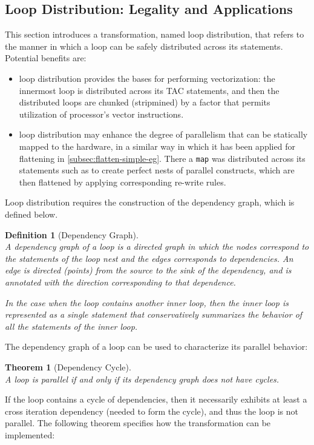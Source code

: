 \documentclass[acmsmall,review]{acmart}\settopmatter{printfolios=true,printccs=false,printacmref=false}
\newtheorem{mydef}{Definition}
\newtheorem{mytheo}{Theorem}
\begin{document}
\subsection{Loop Distribution: Legality and Applications}
\label{subsec:loop-distrib}

This section introduces a transformation, named loop 
distribution, that refers to the manner in which a loop can 
be safely distributed across its statements. 
Potential benefits are:
\begin{itemize}
    \item loop distribution provides the bases for performing 
        vectorization:
        the innermost loop is distributed across its TAC statements,
        and then the distributed loops are chunked (stripmined) 
        by a factor that permits utilization of processor's vector 
        instructions.
    \item loop distribution may enhance the degree of
        parallelism that can be statically mapped to the 
        hardware, in a similar way in which it has been 
        applied for flattening in \cref{subsec:flatten-simple-eg}.
        There a \lstinline{map} was distributed across its
        statements such as to create perfect nests of parallel
        constructs, which are then flattened by applying
        corresponding re-write rules. 
\end{itemize}

Loop distribution requires the construction of the dependency
graph, which is defined below.

\begin{mydef}[Dependency Graph]\label{Dep-Graph}
$\mbox{ }$\\
A dependency graph of a loop is a directed graph in which 
the nodes correspond to the statements of the loop nest and the
edges corresponds to dependencies. An edge is directed (points) 
from the source to the sink of the dependency, and is annotated
with the direction corresponding to that dependence. 

In the case when the loop contains another inner loop, then 
the inner loop is represented as a single statement that conservatively 
summarizes the behavior of all the statements of the inner loop.
\end{mydef}

The dependency graph of a loop can be used to characterize its
parallel behavior:
\begin{mytheo}[Dependency Cycle]\label{Dep-Cycle}
$\mbox{ }$\\
A loop is parallel {\em if and only if} its dependency graph
does not have cycles.
\end{mytheo}
If the loop contains a cycle of dependencies, then it necessarily
exhibits at least a cross iteration dependency (needed to form 
the cycle), and thus the loop is not parallel.  The following
theorem specifies how the transformation can be implemented:
\end{document}
